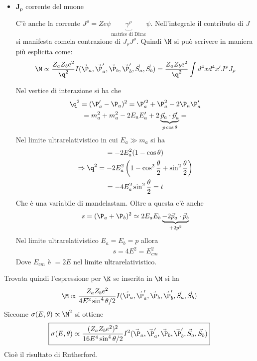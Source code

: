 \documentclass[12pt]{book}
\begin{document}
\begin{itemize}
\begin{itemize}
\begin{itemize}
	\item $\mathbf{J_\rho}$ corrente del muone
	
	C'è anche la corrente $J^\rho= \boxed{Ze} \psi \underbrace{\gamma^\rho}_{\text{matrice di Dirac}} \psi$. Nell'integrale il contributo di $J$ si manifesta comela contrazione di $J_\rho J^\rho$. Quindi $\M$ si può scrivere in maniera più esplicita come:
\begin{equation}
	\M \propto \frac{Z_a Z_b e^2}{\q^2} I (\vec \P_a, \vec \P'_a, \vec \P_b, \vec \P'_b, \vec S_a, \vec S_b) = \frac{Z_a Z_b e^2}{\q^2} \int d^4 x d^4 x' J^\rho J_\rho 
\end{equation} 

Nel vertice di interazione si ha che 
\begin{gather}
	\q^2 = (\P'_a - \P_a)^2 = \P_a'^2 + \P_a^2 - 2 \P_a \P_a'\\
	=m^2_a + m_a^2 - 2 E_a E'_a + 2 \underbrace{\vec p_a \cdot \vec p'_a}_{p \cos \theta }=
\end{gather}
Nel limite ultrarelativistico in cui $E_a \gg m_a$ si ha
\begin{gather}
	=- 2E_a^2 ( 1- \cos \theta )\\
	\Rightarrow \q^2 = -2 E_a^2 \left(1- \cos^2  \frac{\theta}{2}  + \sin^2 \frac{\theta}{2} \right)\\
	=-4 E_a^2 \sin^2 \frac{\theta}{2} = t
\end{gather}
Che è una variabile di mandelastam. Oltre a questa c'è anche
\begin{gather}
	s = ( \P_a + \P_b ) ^2 \simeq 2E_a E_b \underbrace{-  2 \vec p_a \cdot \vec p_b}_{+2p^2}
\end{gather}
Nel limite ultrarelativistico $E_a=E_b = p$ allora
\begin{gather}
	s = 4E^2 = E^2_{cm}
\end{gather}
Dove $E_{cm}$ è $=2E$ nel limite ultrarelativistico.
\end{itemize}

Trovata quindi l'espressione per $\K$ se inserita in $\M$ si ha
\begin{gather}
	\M  \propto \frac{Z_a Z_b e^2}{4 E^2 \sin^4 \theta/2} I (\vec \P_a, \vec \P'_a, \vec \P_b, \vec \P'_b, \vec S_a, \vec S_b)
\end{gather}
Siccome $\sigma (E, \theta) \propto \M^2$ si ottiene
\begin{gather}
	\boxed{\sigma (E,\theta) \propto \frac{(Z_a Z_b e^2)^2}{16 E^4 \sin^4 \theta/2} I^2 (\vec \P_a, \vec \P'_a, \vec \P_b, \vec \P'_b, \vec S_a, \vec S_b)}
\end{gather}
Cioè il risultato di Rutherford.
\end{itemize}

\end{itemize}
\end{document}
